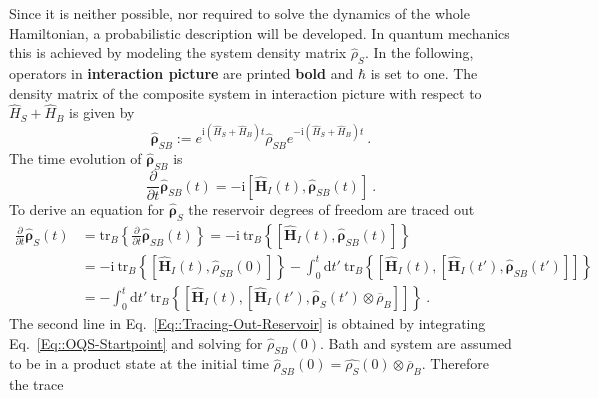 	Since it is neither possible, nor required to solve the dynamics of the whole Hamiltonian, a probabilistic description will be developed. In quantum mechanics this is achieved by modeling the system density matrix $\hat{\rho}_{S}$. In the following, operators in \textbf{interaction picture} are printed \textbf{bold} and $\hbar$ is set to one. The density matrix of the composite system in interaction picture with respect to $\hat{H}_S + \hat{H}_B$ is given by
	\begin{equation}
		\boldsymbol{\hat{\rho}}_{SB} :=	e^{\mathrm{i} \left(\hat{H}_S + \hat{H}_B\right)t} \hat{\rho}_{SB} e^{-\mathrm{i} \left(\hat{H}_S + \hat{H}_B\right)t} ~.
	\end{equation}
	 The time evolution of $\boldsymbol{\hat{\rho}}_{SB}$ is
	\begin{equation} \label{Eq::OQS-Startpoint}
		\frac{\partial}{\partial t}\boldsymbol{\hat{\rho}}_{SB}(t) =	- \mathrm{i} \left[\boldsymbol{\hat{H}}_I(t), \boldsymbol{\hat{\rho}}_{SB}(t) \right] ~.
	\end{equation}
	To derive an equation for $\boldsymbol{\hat{\rho}}_S$ the reservoir degrees of freedom are traced out
	\begin{equation} \label{Eq::Tracing-Out-Reservoir}
		\begin{split}
			\frac{\partial}{\partial t} \boldsymbol{\hat{\rho}}_S(t) &=	\text{tr}_B \left \lbrace \frac{\partial}{\partial t} \boldsymbol{\hat{\rho}}_{SB}(t) \right \rbrace =	-\mathrm{i}~\text{tr}_B \left\lbrace \left[\boldsymbol{\hat{H}}_I(t), \boldsymbol{\hat{\rho}}_{SB}(t)\right] \right\rbrace  \\
			&=	-\mathrm{i}~\text{tr}_B \left\lbrace \left[\boldsymbol{\hat{H}}_I(t), {\hat{\rho}}_{SB}(0)\right] \right \rbrace - \int_{0}^{t} \text{d}t'~ \text{tr}_B \left\{  \left[\boldsymbol{\hat{H}}_I(t), \left[\boldsymbol{\hat{H}}_I(t'), \boldsymbol{\hat{\rho}}_{SB}(t') \right]\right]  \right\} \\
			&=- \int_{0}^{t} \text{d}t'~ \text{tr}_B \left\{  \left[\boldsymbol{\hat{H}}_I(t), \left[\boldsymbol{\hat{H}}_I(t'), \boldsymbol{\hat{\rho}}_S(t') \otimes \overline{\rho}_B \right]\right]  \right\}~.
		\end{split}
	\end{equation}
	The second line in Eq.~\eqref{Eq::Tracing-Out-Reservoir} is obtained by integrating Eq.~\eqref{Eq::OQS-Startpoint} and solving for ${\hat{\rho}}_{SB}(0)$. Bath and system are assumed to be in a product state at the initial time ${\hat{\rho}}_{SB}(0) =	\hat{\rho_S}(0) \otimes \overline{\rho}_B$. Therefore the trace
